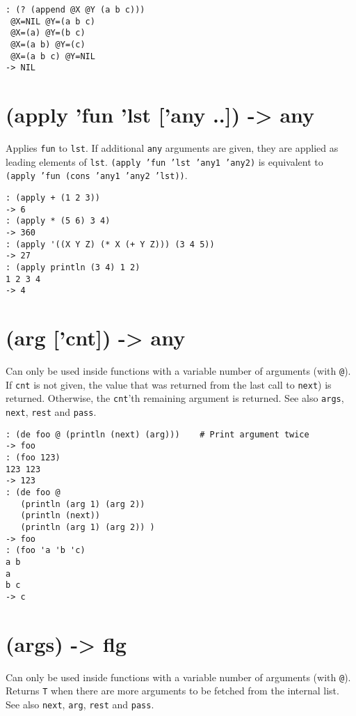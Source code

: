 \begin{verbatim}
: (? (append @X @Y (a b c)))
 @X=NIL @Y=(a b c)
 @X=(a) @Y=(b c)
 @X=(a b) @Y=(c)
 @X=(a b c) @Y=NIL
-> NIL
\end{verbatim}

 
\section{(apply 'fun 'lst ['any ..]) -> any}
\label{sec-8-1-1-21}


Applies \texttt{fun} to \texttt{lst}. If additional \texttt{any} arguments are given, they
are applied as leading elements of \texttt{lst}.
\texttt{(apply 'fun 'lst 'any1 'any2)} is equivalent to
\texttt{(apply 'fun (cons 'any1 'any2 'lst))}.


\begin{verbatim}
: (apply + (1 2 3))
-> 6
: (apply * (5 6) 3 4)
-> 360
: (apply '((X Y Z) (* X (+ Y Z))) (3 4 5))
-> 27
: (apply println (3 4) 1 2)
1 2 3 4
-> 4
\end{verbatim}

 
\section{(arg ['cnt]) -> any}
\label{sec-8-1-1-22}


Can only be used inside functions with a variable number of arguments
(with \texttt{@}). If \texttt{cnt} is not given, the value that was returned from the
last call to \texttt{next}) is returned. Otherwise, the \texttt{cnt}'th remaining
argument is returned. See also \texttt{args}, \texttt{next}, \texttt{rest} and \texttt{pass}.


\begin{verbatim}
: (de foo @ (println (next) (arg)))    # Print argument twice
-> foo
: (foo 123)
123 123
-> 123
: (de foo @
   (println (arg 1) (arg 2))
   (println (next))
   (println (arg 1) (arg 2)) )
-> foo
: (foo 'a 'b 'c)
a b
a
b c
-> c
\end{verbatim}

 
\section{(args) -> flg}
\label{sec-8-1-1-23}


Can only be used inside functions with a variable number of arguments
(with \texttt{@}). Returns \texttt{T} when there are more arguments to be fetched from
the internal list. See also \texttt{next}, \texttt{arg}, \texttt{rest} and \texttt{pass}.



